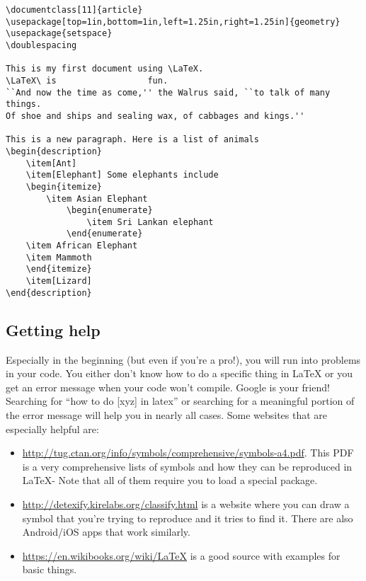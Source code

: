 \begin{lstlisting}
\documentclass[11]{article}
\usepackage[top=1in,bottom=1in,left=1.25in,right=1.25in]{geometry}
\usepackage{setspace}
\doublespacing

This is my first document using \LaTeX.
\LaTeX\ is                  fun.
``And now the time as come,'' the Walrus said, ``to talk of many things.
Of shoe and ships and sealing wax, of cabbages and kings.''

This is a new paragraph. Here is a list of animals
\begin{description}
	\item[Ant]
	\item[Elephant] Some elephants include
	\begin{itemize}
		\item Asian Elephant
			\begin{enumerate}
				\item Sri Lankan elephant
			\end{enumerate}
	\item African Elephant
	\item Mammoth
	\end{itemize}
	\item[Lizard]
\end{description}

\end{lstlisting}

\subsection{Getting help}

Especially in the beginning (but even if you're a pro!), you will run into problems in your code. You either don't know how to do a specific thing in \LaTeX{} or you get an error message when your code won't compile. Google is your friend! Searching for ``how to do [xyz] in latex'' or searching for a meaningful portion of the error message will help you in nearly all cases. Some websites that are especially helpful are:

\begin{itemize}
\item \url{http://tug.ctan.org/info/symbols/comprehensive/symbols-a4.pdf}. This PDF is a very comprehensive lists of symbols and how they can be reproduced in \LaTeX{}- Note that all of them require you to load a special package.
\item \url{http://detexify.kirelabs.org/classify.html} is a website where you can draw a symbol that you're trying to reproduce and it tries to find it. There are also Android/iOS apps that work similarly.
\item \url{https://en.wikibooks.org/wiki/LaTeX} is a good source with examples for basic things.
\end{itemize}

